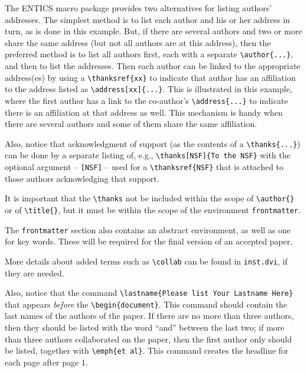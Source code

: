 \documentclass[twoside,11pt]{entics}
\def\lastname{List Authors' Lastnames Here} %
\begin{document}
The ENTICS macro package provides two alternatives for listing authors'
addresses. The simplest method is to list each author and his or her address in
turn, as is done in this example. But, if there are several authors and two or
more share the same address (but not all authors are at this address), then the
preferred method is to list all authors first, each with a separate
\verb+\author{...}+, and then to list the addresses. Then each author can be
linked to the appropriate address(es) by using a \verb+\thanksref{xx}+ to
indicate that author has an affiliation to the address listed as
\verb+\address[xx]{...}+. This is illustrated in this example, where the first
author has a link to the co-author's \verb+\address{...}+ to indicate there is
an affiliation at that address as well. This mechanism is handy when there are
several authors and some of them share the same affiliation.

Also, notice that acknowledgment of support (as the contents of a
\verb+\thanks{...}+) can be done by a separate listing of, e.g.,
\verb+\thanks[NSF]{To the NSF}+ with the optional argument -- \verb+[NSF]+ --
used for a \verb+\thanksref{NSF}+ that is attached to those authors
acknowledging that support.

It is important that the \verb+\thanks+ not be included within the scope of
\verb+\author{}+ or of \verb+\title{}+, but it must be within the scope of the
environment \texttt{frontmatter}.

The \texttt{frontmatter} section also contains an abstract environment, as well
as one for key words. These will be required for the final version of an
accepted paper.

More details about added terms such as \verb+\collab+ can be found in
\texttt{inst.dvi}, if they are needed.

Also, notice that the command \verb+\lastname{Please list Your Lastname Here}+
that appears \emph{before} the \verb+\begin{document}+. This command should
contain the last names of the authors of the paper. If there are no more than
three authors, then they should be listed with the word ``and'' between the
last two; if more than three authors collaborated on the paper, then the first
author only should be listed, together with \verb+\emph{et al}+. This command
creates the headline for each page after page 1.
\end{document}
